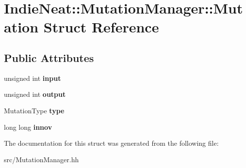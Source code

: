 \hypertarget{struct_indie_neat_1_1_mutation_manager_1_1_mutation}{}\section{Indie\+Neat\+:\+:Mutation\+Manager\+:\+:Mutation Struct Reference}
\label{struct_indie_neat_1_1_mutation_manager_1_1_mutation}
\subsection*{Public Attributes}
\begin{DoxyCompactItemize}
\item 
\mbox{\label{struct_indie_neat_1_1_mutation_manager_1_1_mutation_a0a1d87a46b4496068a605d4a90642416}} 
unsigned int {\bfseries input}
\item 
\mbox{\label{struct_indie_neat_1_1_mutation_manager_1_1_mutation_aeaf66cca2fd67b42eed52dc19e6ec0bb}} 
unsigned int {\bfseries output}
\item 
\mbox{\label{struct_indie_neat_1_1_mutation_manager_1_1_mutation_a651ca54d21cc4859ee42349eedd9fafe}} 
Mutation\+Type {\bfseries type}
\item 
\mbox{\label{struct_indie_neat_1_1_mutation_manager_1_1_mutation_aac7f68b32f823fbe57ee270e89397ab6}} 
long long {\bfseries innov}
\end{DoxyCompactItemize}


The documentation for this struct was generated from the following file\+:\begin{DoxyCompactItemize}
\item 
src/Mutation\+Manager.\+hh\end{DoxyCompactItemize}
